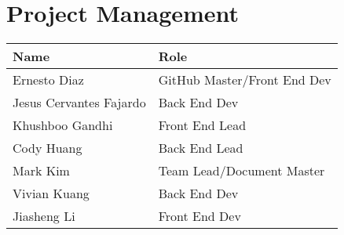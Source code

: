 \pagebreak
\section{Project Management}

\begin{tabular}{ | l | l | }
\hline
Name							& Role\\\hline
Ernesto Diaz					& GitHub Master/Front End Dev\\
Jesus Cervantes Fajardo			& Back End Dev\\
Khushboo Gandhi					& Front End Lead\\
Cody Huang						& Back End Lead\\
Mark Kim						& Team Lead/Document Master\\
Vivian Kuang					& Back End Dev\\
Jiasheng Li						& Front End Dev\\\hline
\end{tabular}